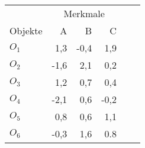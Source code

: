 \begin{tabular}{lrrrrr}
    \toprule
    & \multicolumn{3}{c}{Merkmale} \\
    \cmidrule(lr){2-4}
    Objekte & A & B & C \\ 
    \midrule
    \(O_1\)  & 1,3 & -0,4 & 1,9 \\
    \(O_2\) & -1,6 & 2,1 & 0,2 \\
    \(O_3\) & 1,2 & 0,7 & 0,4 \\
    \(O_4\) & -2,1 & 0,6 & -0,2 \\
    \(O_5\) & 0,8 & 0,6 & 1,1 \\
    \(O_6\) & -0,3 & 1,6 & 0.8 \\
    \bottomrule
\end{tabular}